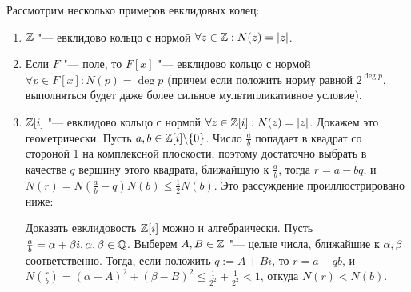 \begin{example}
	Рассмотрим несколько примеров евклидовых колец:
	\begin{enumerate}
		\item $\mathbb{Z}$ "--- евклидово кольцо с нормой $\forall z \in \mathbb{Z}: N(z) = |z|$.
		\item Если $F$ "--- поле, то $F[x]$ "--- евклидово кольцо с нормой $\forall p \in F[x]: N(p) = \deg{p}$ (причем если положить норму равной $2^{\deg{p}}$, выполняться будет даже более сильное мультипликативное условие).
		\item $\mathbb{Z}[i]$ "--- евклидово кольцо с нормой $\forall z \in \mathbb{Z}[i]: N(z) = |z|$. Докажем это геометрически. Пусть $a, b \in \mathbb{Z}[i] \backslash \{0\}$. Число $\frac ab$ попадает в квадрат со стороной 1 на комплексной плоскости, поэтому достаточно выбрать в качестве $q$ вершину этого квадрата, ближайшую к $\frac ab$, тогда $r = a - bq$, и $N(r) = N(\frac ab - q)N(b) \le \frac12N(b)$. Это рассуждение проиллюстрировано ниже:
		\begin{center}
		\end{center}
	
		Доказать евклидовость $\mathbb{Z}[i]$ можно и алгебраически. Пусть $\frac ab = \alpha + \beta i, \alpha, \beta \in \mathbb{Q}$. Выберем $A, B \in \mathbb{Z}$ "--- целые числа, ближайшие к $\alpha, \beta$ соответственно. Тогда, если положить $q := A + Bi$, то $r = a - qb$, и $N(\frac{r}{b}) = (\alpha - A)^2 + (\beta - B)^2 \le \frac1{2^2} + \frac1{2^2} < 1$, откуда $N(r) < N(b)$.
	\end{enumerate}
\end{example}


